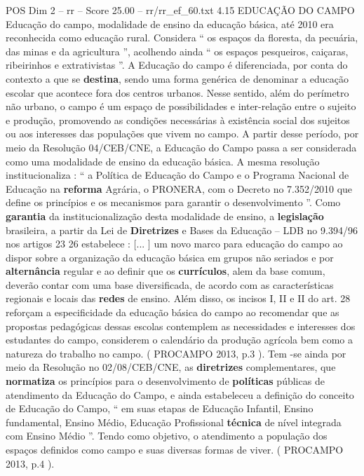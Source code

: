\begin{textsample}{POS Dim 2 – rr – Score 25.00 – rr/rr\_ef\_60.txt}  \label{ex:f2_pos_110}
4.15 EDUCAÇÃO DO CAMPO Educação do campo, modalidade de ensino da educação básica, até 2010 era reconhecida como educação rural.
Considera “ os espaços da floresta, da pecuária, das minas e da agricultura ”, acolhendo ainda “ os espaços pesqueiros, caiçaras, ribeirinhos e extrativistas ”.
A Educação do campo é diferenciada, por conta do contexto a que se \textbf{destina}, sendo uma forma genérica de denominar a educação escolar que acontece fora dos centros urbanos.
Nesse sentido, além do perímetro não urbano, o campo é um espaço de possibilidades e inter-relação entre o sujeito e produção, promovendo as condições necessárias à existência social dos sujeitos ou aos interesses das populações que vivem no campo.
A partir desse período, por meio da Resolução 04/CEB/CNE, a Educação do Campo passa a ser considerada como uma modalidade de ensino da educação básica.
A mesma resolução institucionaliza : “ a Política de Educação do Campo e o Programa Nacional de Educação na \textbf{reforma} Agrária, o PRONERA, com o Decreto no 7.352/2010 que define os princípios e os mecanismos para garantir o desenvolvimento ”.
Como \textbf{garantia} da institucionalização desta modalidade de ensino, a \textbf{legislação} brasileira, a partir da Lei de \textbf{Diretrizes} e Bases da Educação – LDB no 9.394/96 nos artigos 23 26 estabelece : [... ] um novo marco para educação do campo ao dispor sobre a organização da educação básica em grupos não seriados e por \textbf{alternância} regular e ao definir que os \textbf{currículos}, alem da base comum, deverão contar com uma base diversificada, de acordo com as características regionais e locais das \textbf{redes} de ensino.
Além disso, os incisos I, II e II do art. 28 reforçam a especificidade da educação básica do campo ao recomendar que as propostas pedagógicas dessas escolas contemplem as necessidades e interesses dos estudantes do campo, considerem o calendário da produção agrícola bem como a natureza do trabalho no campo. ( PROCAMPO 2013, p.3 ).
Tem -se ainda por meio da Resolução no 02/08/CEB/CNE, as \textbf{diretrizes} complementares, que \textbf{normatiza} os princípios para o desenvolvimento de \textbf{políticas} públicas de atendimento da Educação do Campo, e ainda estabeleceu a definição do conceito de Educação do Campo, “ em suas etapas de Educação Infantil, Ensino fundamental, Ensino Médio, Educação Profissional \textbf{técnica} de nível integrada com Ensino Médio ”.
Tendo como objetivo, o atendimento a população dos espaços definidos como campo e suas diversas formas de viver. ( PROCAMPO 2013, p.4 ).

\end{textsample}
